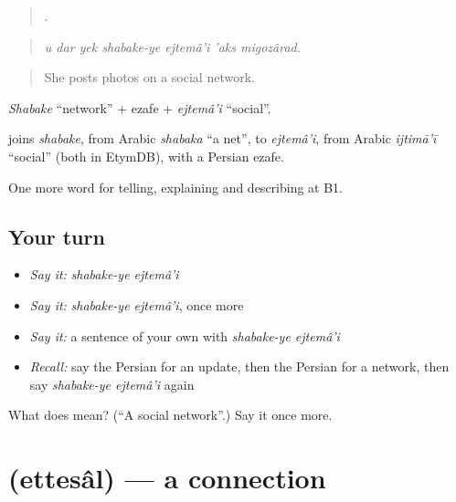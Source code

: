 \begin{quote}
      .
\end{quote}

\begin{quote}
\emph{u dar yek shabake-ye ejtemâ'i 'aks migozârad.}
\end{quote}

\begin{quote}
She posts photos on a social network.
\end{quote}

\emph{Shabake} \textquotedblleft{}network\textquotedblright{} + ezafe + \emph{ejtemâ'i} \textquotedblleft{}social\textquotedblright{}.

\begin{cousinweb}
\textbf{ } joins \emph{shabake}, from Arabic \emph{shabaka} \textquotedblleft{}a net\textquotedblright{}, to \emph{ejtemâ'i}, from Arabic \emph{ijtimā'ī} \textquotedblleft{}social\textquotedblright{} (both in EtymDB), with a Persian ezafe.
\end{cousinweb}

\begin{grammarlens}[title={What you've built}]
One more word for telling, explaining and describing at B1.
\end{grammarlens}

\subsection*{Your turn}
\begin{itemize}
\raggedright
  \item \emph{Say it:} \emph{shabake-ye ejtemâ'i}
  \item \emph{Say it:} \emph{shabake-ye ejtemâ'i}, once more
  \item \emph{Say it:} a sentence of your own with \emph{shabake-ye ejtemâ'i}
  \item \emph{Recall:} say the Persian for an update, then the Persian for a network, then say \emph{shabake-ye ejtemâ'i} again
\end{itemize}

\begin{tcolorbox}[breakable,colback=teal!4,colframe=teal!35!black,title={Before you move on}]
What does   mean? (\textquotedblleft{}A social network\textquotedblright{}.) Say it once more.
\end{tcolorbox}
\section[\texorpdfstring{\fa{اتصال} (ettesâl)}{اتصال (ettesâl)}]{ (ettesâl) — a connection}

